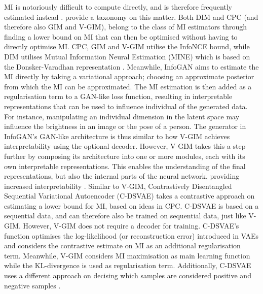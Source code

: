 	MI is notoriously difficult to compute directly, and is therefore frequently estimated instead \citep{tschannenMutualInformationMaximization2020}. \cite{pooleVariationalBoundsMutual2019} provide a taxonomy on this matter. Both DIM and CPC (and therefore also GIM and V-GIM), belong to the class of MI estimators through finding a lower bound on MI that can then be optimised without having to directly optimise MI. CPC, GIM and V-GIM utilise the InfoNCE bound, while DIM utilises Mutual Information Neural Estimation (MINE) \citep{belghaziMINEMutualInformation2021} which is based on the Donsker-Varadhan representation \citep{donskerAsymptoticEvaluationCertain1976}. Meanwhile, InfoGAN aims to estimate the MI directly by taking a variational approach; choosing an approximate posterior from which the MI can be approximated. The MI estimation is then added as a regularisation term to a GAN-like loss function, resulting in interpretable representations that can be used to influence individual of the generated data. For instance, manipulating an individual dimension in the latent space may influence the brightness in an image or the pose of a person. The generator in InfoGAN's GAN-like architecture is thus similar to how V-GIM achieves interpretability using the optional decoder. However, V-GIM takes this a step further by composing its architecture into one or more modules, each with its own interpretable representations. This enables the understanding of the final representations, but also the internal parts of the neural network, providing increased interpretability \citep{chenInfoGANInterpretableRepresentation2016}.
	Similar to V-GIM, Contrastively Disentangled Sequential Variational Autoencoder (C-DSVAE) takes a contrastive approach on estimating a lower bound for MI, based on ideas in CPC. C-DSVAE is based on a sequential data, and can therefore also be trained on sequential data, just like V-GIM. However, V-GIM does not require a decoder for training. C-DSVAE's function optimises the log-likelihood (or reconstruction error) introduced in VAEs and considers the contrastive estimate on MI as an additional regularisation term. Meanwhile, V-GIM considers MI maximisation as main learning function while the KL-divergence is used as regularisation term. Additionally, C-DSVAE uses a different approach on decising which samples are considered positive and negative samples \cite{baiContrastivelyDisentangledSequential2021}.

	
